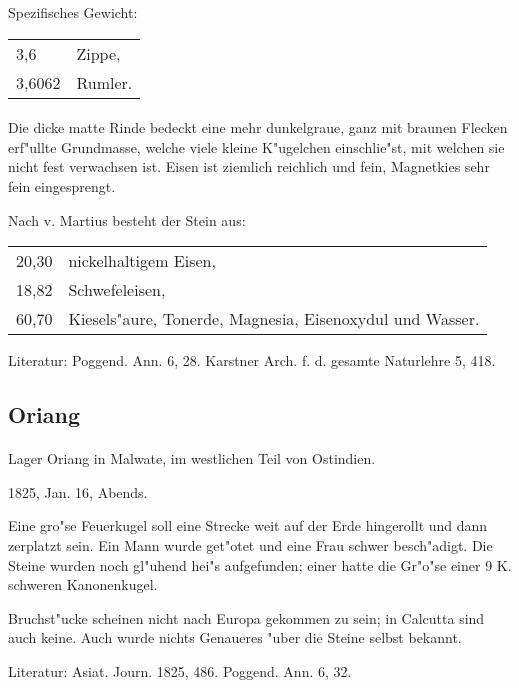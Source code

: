 \documentclass[a4paper, 11pt, oneside]{article}
\begin{document}
Spezifisches Gewicht:
\begin{table}[!ht]
    \centering
    \begin{tabular}{l l}
        3,6 & Zippe,\\
        3,6062 & Rumler.
    \end{tabular}
\end{table}
\paragraph{}
Die dicke matte Rinde bedeckt eine mehr dunkelgraue, ganz mit braunen Flecken erf"ullte Grundmasse, welche viele kleine K"ugelchen einschlie"st, mit welchen sie nicht fest verwachsen ist. Eisen ist ziemlich reichlich und fein, Magnetkies sehr fein eingesprengt.

Nach v. Martius besteht der Stein aus:
\begin{table}[!ht]
    \centering
    \begin{tabular}{l p{50mm}}
        20,30 & nickelhaltigem Eisen, \\
        18,82 & Schwefeleisen, \\
        60,70 & Kiesels"aure, Tonerde, Magnesia, Eisenoxydul und Wasser. \\
    \end{tabular}
\end{table} 

\footnotesize
Literatur: Poggend. Ann. 6, 28. Karstner Arch. f. d. gesamte Naturlehre 5, 418.

\subsection{Oriang}
\normalsize
\paragraph{}
Lager Oriang in Malwate, im westlichen Teil von Ostindien.

1825, Jan. 16, Abends.

Eine gro"se Feuerkugel soll eine Strecke weit auf der Erde hingerollt und dann zerplatzt sein. Ein Mann wurde get"otet und eine Frau schwer besch"adigt. Die Steine wurden noch gl"uhend hei"s aufgefunden; einer hatte die Gr"o"se einer 9 K. schweren Kanonenkugel.

Bruchst"ucke scheinen nicht nach Europa gekommen zu sein; in Calcutta sind auch keine. Auch wurde nichts Genaueres "uber die Steine selbst bekannt.

\footnotesize
Literatur: Asiat. Journ. 1825, 486. Poggend. Ann. 6, 32.
\end{document}
